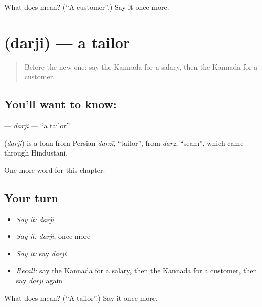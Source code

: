 \begin{tcolorbox}[breakable,colback=teal!4,colframe=teal!35!black,title={Before you move on}]
What does  mean? (\textquotedblleft{}A customer\textquotedblright{}.) Say it once more.
\end{tcolorbox}
\section[\texorpdfstring{\kn{ದರ್ಜಿ} (darji)}{ದರ್ಜಿ (darji)}]{ (darji) — a tailor}

\label{lesson:KA-C194-darji}



\begin{quote}
Before the new one: say the Kannada for a salary, then the Kannada for a customer.
\end{quote}

\subsection*{You'll want to know: }
\textbf{} — \emph{darji} — \textquotedblleft{}a tailor\textquotedblright{}.

\begin{cousinweb}
\textbf{} (\emph{darji}) is a loan from Persian \emph{darzī}, \textquotedblleft{}tailor\textquotedblright{}, from \emph{darz}, \textquotedblleft{}seam\textquotedblright{}, which came through Hindustani.
\end{cousinweb}

\begin{grammarlens}[title={What you've built}]
One more word for this chapter.
\end{grammarlens}

\subsection*{Your turn}
\begin{itemize}
\raggedright
  \item \emph{Say it:} \emph{darji}
  \item \emph{Say it:} \emph{darji}, once more
  \item \emph{Say it:} say \emph{darji}
  \item \emph{Recall:} say the Kannada for a salary, then the Kannada for a customer, then say \emph{darji} again
\end{itemize}

\begin{tcolorbox}[breakable,colback=teal!4,colframe=teal!35!black,title={Before you move on}]
What does  mean? (\textquotedblleft{}A tailor\textquotedblright{}.) Say it once more.
\end{tcolorbox}
